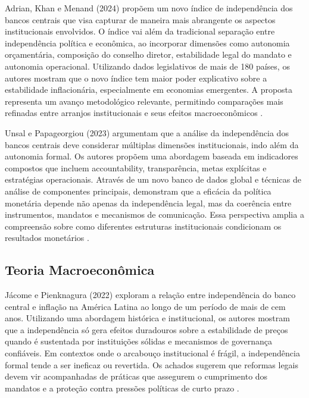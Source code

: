 \documentclass[a4paper,12pt]{article}
\begin{document}
Adrian, Khan e Menand (2024) propõem um novo índice de independência dos bancos centrais que visa capturar de maneira mais abrangente os aspectos institucionais envolvidos. O índice vai além da tradicional separação entre independência política e econômica, ao incorporar dimensões como autonomia orçamentária, composição do conselho diretor, estabilidade legal do mandato e autonomia operacional. Utilizando dados legislativos de mais de 180 países, os autores mostram que o novo índice tem maior poder explicativo sobre a estabilidade inflacionária, especialmente em economias emergentes. A proposta representa um avanço metodológico relevante, permitindo comparações mais refinadas entre arranjos institucionais e seus efeitos macroeconômicos \cite{adrian2024}.

Unsal e Papageorgiou (2023) argumentam que a análise da independência dos bancos centrais deve considerar múltiplas dimensões institucionais, indo além da autonomia formal. Os autores propõem uma abordagem baseada em indicadores compostos que incluem accountability, transparência, metas explícitas e estratégias operacionais. Através de um novo banco de dados global e técnicas de análise de componentes principais, demonstram que a eficácia da política monetária depende não apenas da independência legal, mas da coerência entre instrumentos, mandatos e mecanismos de comunicação. Essa perspectiva amplia a compreensão sobre como diferentes estruturas institucionais condicionam os resultados monetários \cite{unsal2023}.

\subsection*{\textbf{Teoria Macroeconômica}}

Jácome e Pienknagura (2022) exploram a relação entre independência do banco central e inflação na América Latina ao longo de um período de mais de cem anos. Utilizando uma abordagem histórica e institucional, os autores mostram que a independência só gera efeitos duradouros sobre a estabilidade de preços quando é sustentada por instituições sólidas e mecanismos de governança confiáveis. Em contextos onde o arcabouço institucional é frágil, a independência formal tende a ser ineficaz ou revertida. Os achados sugerem que reformas legais devem vir acompanhadas de práticas que assegurem o cumprimento dos mandatos e a proteção contra pressões políticas de curto prazo \cite{jacome2022}.
\end{document}
